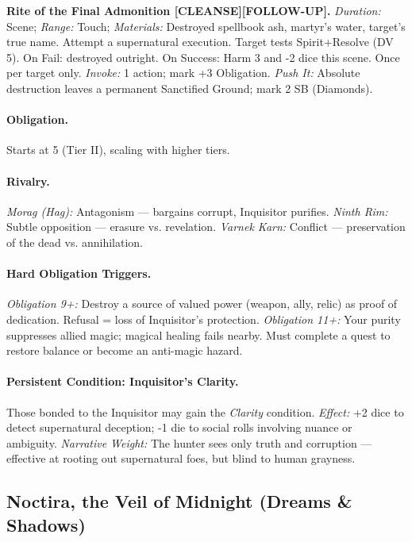 \documentclass[11pt]{article}
\begin{document}
\textbf{Rite of the Final Admonition [CLEANSE][FOLLOW-UP].}
\emph{Duration:} Scene; \emph{Range:} Touch; \emph{Materials:} Destroyed spellbook ash, martyr's water, target's true name.
Attempt a supernatural execution. Target tests Spirit+Resolve (DV 5). On Fail: destroyed outright. On Success: Harm 3 and -2 dice this scene. Once per target only.
\emph{Invoke:} 1 action; mark +3 Obligation.
\emph{Push It:} Absolute destruction leaves a permanent Sanctified Ground; mark 2 SB (Diamonds).

\paragraph{Obligation.}
Starts at 5 (Tier II), scaling with higher tiers.

\paragraph{Rivalry.}
\emph{Morag (Hag):} Antagonism --- bargains corrupt, Inquisitor purifies.
\emph{Ninth Rim:} Subtle opposition --- erasure vs. revelation.
\emph{Varnek Karn:} Conflict --- preservation of the dead vs. annihilation.

\paragraph{Hard Obligation Triggers.}
\emph{Obligation 9+:} Destroy a source of valued power (weapon, ally, relic) as proof of dedication. Refusal = loss of Inquisitor's protection.
\emph{Obligation 11+:} Your purity suppresses allied magic; magical healing fails nearby. Must complete a quest to restore balance or become an anti-magic hazard.

\paragraph{Persistent Condition: Inquisitor's Clarity.}
Those bonded to the Inquisitor may gain the \emph{Clarity} condition.
\emph{Effect:} +2 dice to detect supernatural deception; -1 die to social rolls involving nuance or ambiguity.
\emph{Narrative Weight:} The hunter sees only truth and corruption --- effective at rooting out supernatural foes, but blind to human grayness.

\subsection{Noctira, the Veil of Midnight (Dreams \& Shadows)}
\end{document}
